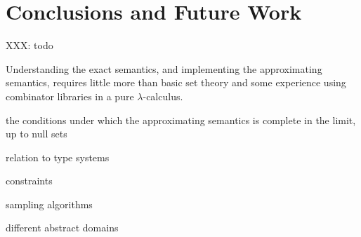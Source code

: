 \documentclass{llncs}
\begin{document}

\section{Conclusions and Future Work}

XXX: todo

Understanding the exact semantics, and implementing the approximating semantics, requires little more than basic set theory and some experience using combinator libraries in a pure $\lambda$-calculus.

the conditions under which the approximating semantics is complete in the limit, up to null sets

relation to type systems

constraints

sampling algorithms

different abstract domains









\end{document}
